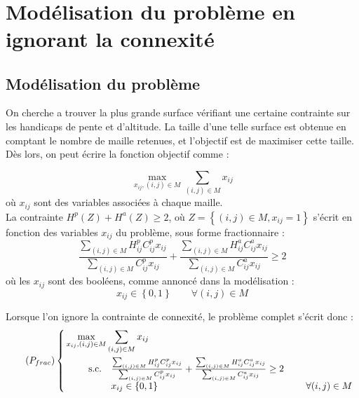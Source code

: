 \documentclass[a4paper,11pt]{article}
\begin{document}
~\\
\section{Modélisation du problème en ignorant la connexité}


\subsection{Modélisation du problème}

On cherche a trouver la plus grande surface vérifiant une certaine contrainte sur les handicaps de pente et d'altitude. La taille d'une telle surface est obtenue en comptant le nombre de maille retenues, et l'objectif est de maximiser cette taille. Dès lors, on peut écrire la fonction objectif comme :

\begin{equation}
\max_{x_{ij}, (i,j) \in M} \sum_{(i,j) \in M} x_{ij}
\end{equation}
où $x_{ij}$ sont des variables associées à chaque maille.\\


La contrainte $H^p(Z) + H^a(Z) \ge 2$, où $Z = \left\{ (i,j) \in M, x_{ij} = 1 \right\}$ s'écrit en fonction des variables $x_{ij}$ du problème, sous forme fractionnaire :
\begin{equation}
\frac{\sum_{(i,j)\in M} H^p_{ij} C^p_{ij} x_{ij}}{\sum_{(i,j)\in M} C^p_{ij} x_{ij}} + \frac{\sum_{(i,j)\in M} H^a_{ij} C^a_{ij} x_{ij}}{\sum_{(i,j)\in M} C^a_{ij} x_{ij}} \ge 2
\label{eq:contr_frac}
\end{equation}
où les $x_{ij}$ sont des booléens, comme annoncé dans la modélisation :
\begin{equation}
x_{ij} \in \left\{0,1 \right\} \qquad \forall (i,j) \in M
\end{equation}



Lorsque l'on ignore la contrainte de connexité, le problème complet s'écrit donc :
\begin{equation}\tag{$P_{frac}$}
\left\{ \begin{aligned}
& \max_{x_{ij}, (i,j) \in M} \sum_{(i,j) \in M} x_{ij} \\
& \qquad \begin{array}{cll}
\text{s.c.} & \frac{\sum_{(i,j)\in M} H^p_{ij} C^p_{ij} x_{ij}}{\sum_{(i,j)\in M} C^p_{ij} x_{ij}} + \frac{\sum_{(i,j)\in M} H^a_{ij} C^a_{ij} x_{ij}}{\sum_{(i,j)\in M} C^a_{ij} x_{ij}} \ge 2 & ~ \\
~ & x_{ij} \in \left\{0,1 \right\} &  ~~~~ \forall (i,j) \in M
\end{array} 
\end{aligned} \right.
\end{equation}
\end{document}
